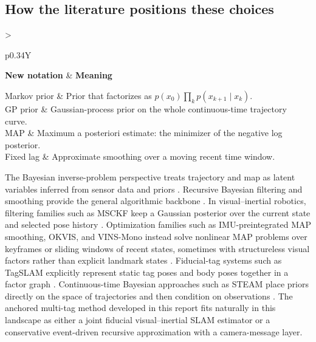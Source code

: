 \documentclass[11pt]{report}
\newcommand{\NotationTable}[1]{%
\vspace{0.6mm}
{\scriptsize
\setlength{\tabcolsep}{2.5pt}
\begin{tabularx}{\columnwidth}{>{\raggedright\arraybackslash}p{0.34\columnwidth}Y}
\toprule
\textbf{New notation} & \textbf{Meaning}\\
\midrule
#1\\
\bottomrule
\end{tabularx}}
\vspace{0.8mm}}
\begin{document}
\subsection{How the literature positions these choices}
\NotationTable{
Markov prior & Prior that factorizes as $p(x_0)\prod_k p(x_{k+1}\mid x_k)$.\\
GP prior & Gaussian-process prior on the whole continuous-time trajectory curve.\\
MAP & Maximum a posteriori estimate: the minimizer of the negative log posterior.\\
Fixed lag & Approximate smoothing over a moving recent time window.}

The Bayesian inverse-problem perspective treats trajectory and map as latent variables inferred from sensor data and priors \citep{stuart2010inverse}. Recursive Bayesian filtering and smoothing provide the general algorithmic backbone \citep{sarkka2023bayesian}. In visual--inertial robotics, filtering families such as MSCKF keep a Gaussian posterior over the current state and selected pose history \citep{mourikis2007msckf}. Optimization families such as IMU-preintegrated MAP smoothing, OKVIS, and VINS-Mono instead solve nonlinear MAP problems over keyframes or sliding windows of recent states, sometimes with structureless visual factors rather than explicit landmark states \citep{Forster2015,forster2017preintegration,leutenegger2015okvis,VINSMono2017}. Fiducial-tag systems such as TagSLAM explicitly represent static tag poses and body poses together in a factor graph \citep{TagSLAM2019}. Continuous-time Bayesian approaches such as STEAM place priors directly on the space of trajectories and then condition on observations \citep{Barfoot2014,anderson2015gp}. The anchored multi-tag method developed in this report fits naturally in this landscape as either a joint fiducial visual--inertial SLAM estimator or a conservative event-driven recursive approximation with a camera-message layer.
\end{document}
